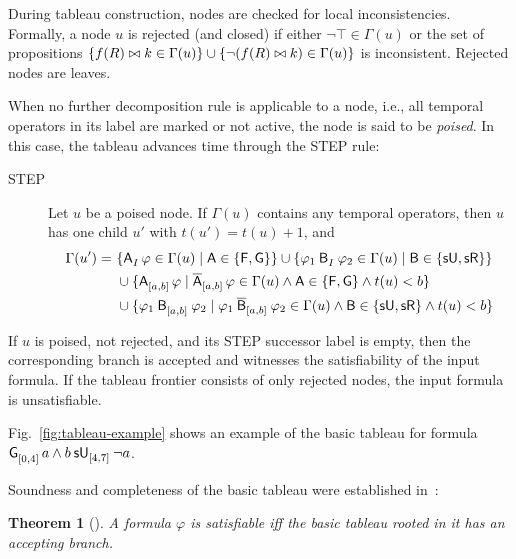 \documentclass{easychair}
\newtheorem{theorem}{Theorem}
\begin{document}
During tableau construction, nodes are checked for local inconsistencies. Formally, a node $u$ is rejected (and closed) if either $\neg \top \in \Gamma(u)$ or the set of propositions $\set{f(R) \bowtie k \in \Gamma(u)} \cup \set{\lnot(f(R) \bowtie k) \in \Gamma(u)}$ is inconsistent.
Rejected nodes are leaves.

When no further decomposition rule is applicable to a node, i.e., all temporal operators in its label are marked or not active, the node is said to be \emph{poised}.
In this case, the tableau advances time through the \textsf{STEP} rule:
%
\begin{description}
    \item[\textsf{STEP}]
    Let $u$ be a poised node. If $\Gamma(u)$ contains any temporal operators, then $u$ has one child $u'$ with $t(u')=t(u)+1$, and
    \begin{align*}
    \Gamma(u') =
    \ & \set{\anyunop{I}{\varphi} \in \Gamma(u) \mid \mathsf{A} \in \set{\evenop, \globop}}
    \cup \set{\anybinop{I}{\varphi_1}{\varphi_2} \in \Gamma(u) \mid \mathsf{B} \in \set{\suntilop, \sreleaseop}} \\
    &\cup \set{\anyunop{[a,b]}{\varphi} \mid \stlunop{\marked{\mathsf{A}}}{[a,b]}{\varphi} \in \Gamma(u) \land \mathsf{A} \in \set{\evenop, \globop} \land t(u) < b} \\
    &\cup
    \set{\anybinop{[a,b]}{\varphi_1}{\varphi_2} \mid \stlbinop{\marked{\mathsf{B}}}{[a,b]}{\varphi_1}{\varphi_2} \in \Gamma(u) \land \mathsf{B} \in \set{\suntilop, \sreleaseop} \land t(u) < b}
    \end{align*}
\end{description}

If $u$ is poised, not rejected, and its \textsf{STEP} successor label is empty,
then the corresponding branch is accepted and witnesses the satisfiability
of the input formula.
If the tableau frontier consists of only rejected nodes, the input formula is unsatisfiable.

Fig.~\ref{fig:tableau-example} shows an example of the basic tableau for formula $\glob{[0,4]}a \land \suntil{[4,7]}{b}{\neg a}$.

Soundness and completeness of the basic tableau were established in~\cite{MelaniBC25}:
\begin{theorem}[{\cite[Theorem 4.4 and Lemma 3]{MelaniBC25}}]
    A formula $\varphi$ is satisfiable iff the basic tableau rooted in it has an accepting branch.
\end{theorem}
\end{document}
